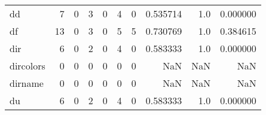 \begin{longtable}{lrrrrrrrrr}
dd        &                                       7 &                                                  0 &                                                  3 &                                                  0 &                                                  4 &                                                  0 &                                           0.535714 &                                    1.0 &                             0.000000 \\
df        &                                      13 &                                                  0 &                                                  3 &                                                  0 &                                                  5 &                                                  5 &                                           0.730769 &                                    1.0 &                             0.384615 \\
dir       &                                       6 &                                                  0 &                                                  2 &                                                  0 &                                                  4 &                                                  0 &                                           0.583333 &                                    1.0 &                             0.000000 \\
dircolors &                                       0 &                                                  0 &                                                  0 &                                                  0 &                                                  0 &                                                  0 &                                                NaN &                                    NaN &                                  NaN \\
dirname   &                                       0 &                                                  0 &                                                  0 &                                                  0 &                                                  0 &                                                  0 &                                                NaN &                                    NaN &                                  NaN \\
du        &                                       6 &                                                  0 &                                                  2 &                                                  0 &                                                  4 &                                                  0 &                                           0.583333 &                                    1.0 &                             0.000000 \\

\end{longtable}
